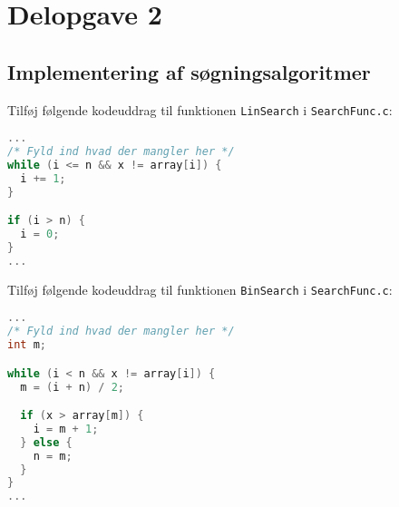 \section{Delopgave 2}\label{sec:delopgave-22}

\subsection{Implementering af søgningsalgoritmer}\label{subsec:implementering-af-sgningsalgoritmer}

Tilføj følgende kodeuddrag til funktionen \lstinline{LinSearch} i \lstinline{SearchFunc.c}:

\begin{lstlisting}[language=C, label={lst:lstlisting-lin}]
...
/* Fyld ind hvad der mangler her */
while (i <= n && x != array[i]) {
  i += 1;
}

if (i > n) {
  i = 0;
}
...
\end{lstlisting}

Tilføj følgende kodeuddrag til funktionen \lstinline{BinSearch} i \lstinline{SearchFunc.c}:

\begin{lstlisting}[language=C, label={lst:lstlisting-bin}]
...
/* Fyld ind hvad der mangler her */
int m;

while (i < n && x != array[i]) {
  m = (i + n) / 2;

  if (x > array[m]) {
    i = m + 1;
  } else {
    n = m;
  }
}
...
\end{lstlisting}
